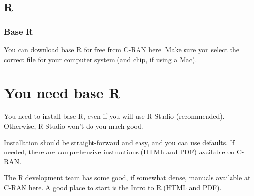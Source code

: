 \documentclass[
  letterpaper,
  DIV=11,
  numbers=noendperiod]{scrreprt}
\begin{document}
\hypertarget{r}{%
\section{R}\label{r}}

\hypertarget{base-r}{%
\subsection{Base R}\label{base-r}}

You can download base R for free from C-RAN
\href{https://cran.r-project.org/}{here}. Make sure you select the
correct file for your computer system (and chip, if using a Mac).

\begin{tcolorbox}[enhanced jigsaw, colframe=quarto-callout-caution-color-frame, opacityback=0, leftrule=.75mm, bottomrule=.15mm, rightrule=.15mm, left=2mm, toptitle=1mm, colback=white, bottomtitle=1mm, titlerule=0mm, title=\textcolor{quarto-callout-caution-color}{\faFire}\hspace{0.5em}{Danger}, arc=.35mm, toprule=.15mm, breakable, coltitle=black, colbacktitle=quarto-callout-caution-color!10!white, opacitybacktitle=0.6]


\hypertarget{you-need-base-r}{%
\chapter{You need base R}\label{you-need-base-r}}

You need to install base R, even if you will use R-Studio (recommended).
Otherwise, R-Studio won't do you much good.

\end{tcolorbox}

Installation should be straight-forward and easy, and you can use
defaults. If needed, there are comprehensive instructions
(\href{https://cran.r-project.org/doc/manuals/r-release/R-admin.html}{HTML}
and
\href{https://cran.r-project.org/doc/manuals/r-release/R-admin.pdf}{PDF})
available on C-RAN.

The R development team has some good, if somewhat dense, manuals
available at C-RAN \href{https://cran.r-project.org/manuals.html}{here}.
A good place to start is the Intro to R
(\href{https://cran.r-project.org/doc/manuals/r-release/R-intro.html}{HTML}
and
\href{https://cran.r-project.org/doc/manuals/r-release/R-intro.pdf}{PDF}).
\end{document}
